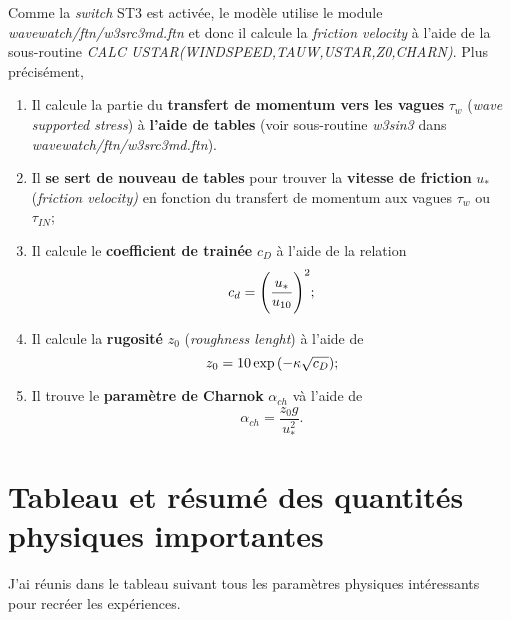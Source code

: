 \documentclass[10pt]{report}
\numberwithin{equation}{section}
\newcommand{\venti}{\vphantom{\sum_x^x}}
\begin{document}
Comme la \emph{switch} ST3 est activée, le modèle utilise le module \emph{wavewatch/ftn/w3src3md.ftn} et donc il calcule la \emph{friction velocity} à l'aide de la sous-routine \emph{CALC USTAR(WINDSPEED,TAUW,USTAR,Z0,CHARN)}.
Plus précisément,
\begin{enumerate}
\item Il calcule la partie du \textbf{transfert de momentum vers les vagues} \(\tau_w\) (\emph{wave supported stress}) à \textbf{l'aide de tables} (voir sous-routine \emph{w3sin3} dans \emph{wavewatch/ftn/w3src3md.ftn}).
\item Il \textbf{se sert de nouveau de tables} pour trouver la \textbf{vitesse de friction} \(u_*\) (\emph{friction velocity)} en fonction du transfert de momentum aux vagues \(\tau_w\) ou \(\tau_{IN}\);
\item Il calcule le \textbf{coefficient de trainée} \(c_D\) à l'aide de la relation
\begin{equation}
   c_d = \qty(\venti\frac{u_*}{u_{10}})^2;
\end{equation}
\item Il calcule la \textbf{rugosité} \(z_0\) (\emph{roughness lenght}) à l'aide de
\begin{equation}
   z_0 = 10 \exp \qty(-\kappa \sqrt{c_D});
\end{equation}
\item Il trouve le \textbf{paramètre de Charnok} \(\alpha_{ch}\) và l'aide de 
\begin{equation}
   \alpha_{ch} = \frac{z_0 g}{u_*^2}.
\end{equation}
\end{enumerate}
\section{Tableau et résumé des quantités physiques importantes}
\label{sec:org924544b}

J'ai réunis dans le tableau suivant tous les paramètres physiques intéressants pour recréer les expériences.
\end{document}
